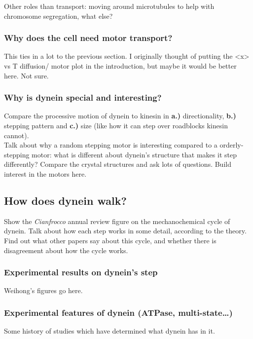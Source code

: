\documentclass[10pt]{article} %
\begin{document}
Other roles than transport: moving around microtubules to help with chromosome segregation, what else?

\subsubsection{Why does the cell need motor transport?}

\cite{dewitt2012cytoplasmic}


This ties in a lot to the previous section. I originally thought of putting the <x> vs T diffusion/
motor plot in the introduction, but maybe it would be better here. Not sure.\\

\subsubsection{Why is dynein special and interesting?}
Compare the processive motion of dynein to kinesin in \textbf{a.)} directionality, \textbf{b.)}
stepping pattern and \textbf{c.)} size (like how it can step over roadblocks kinesin cannot).\\

Talk about why a random stepping motor is interesting compared to a orderly-stepping motor: what
is different about dynein's structure that makes it step differently? Compare the crystal structures
and ask lots of questions. Build interest in the motors here.\\

\subsection{How does dynein walk?}
Show the \textit{Cianfrocco} annual review figure on the mechanochemical cycle of dynein. Talk about
how each step works in some detail, according to the theory. Find out what other papers say about
this cycle, and whether there is disagreement about how the cycle works.


\subsubsection{Experimental results on dynein’s step}
Weihong's figures go here.\\
\subsubsection{Experimental features of dynein (ATPase, multi-state…)}
Some history of studies which have determined what dynein has in it.\\
\end{document}

